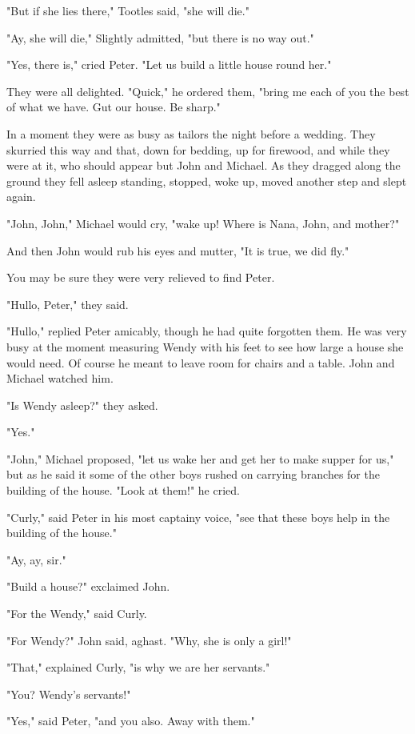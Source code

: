 "But if she lies there," Tootles said, "she will die."


"Ay, she will die," Slightly admitted, "but there is no way out."


"Yes, there is," cried Peter. "Let us build a little house round her."


They were all delighted. "Quick," he ordered them, "bring me each of you
the best of what we have. Gut our house. Be sharp."


In a moment they were as busy as tailors the night before a wedding. They
skurried this way and that, down for bedding, up for firewood, and while
they were at it, who should appear but John and Michael. As they dragged
along the ground they fell asleep standing, stopped, woke up, moved
another step and slept again.


"John, John," Michael would cry, "wake up! Where is Nana, John, and
mother?"


And then John would rub his eyes and mutter, "It is true, we did fly."


You may be sure they were very relieved to find Peter.


"Hullo, Peter," they said.


"Hullo," replied Peter amicably, though he had quite forgotten them. He
was very busy at the moment measuring Wendy with his feet to see how large
a house she would need. Of course he meant to leave room for chairs and a
table. John and Michael watched him.


"Is Wendy asleep?" they asked.


"Yes."


"John," Michael proposed, "let us wake her and get her to make supper for
us," but as he said it some of the other boys rushed on carrying branches
for the building of the house. "Look at them!" he cried.


"Curly," said Peter in his most captainy voice, "see that these boys help
in the building of the house."


"Ay, ay, sir."


"Build a house?" exclaimed John.


"For the Wendy," said Curly.


"For Wendy?" John said, aghast. "Why, she is only a girl!"


"That," explained Curly, "is why we are her servants."


"You? Wendy's servants!"


"Yes," said Peter, "and you also. Away with them."


